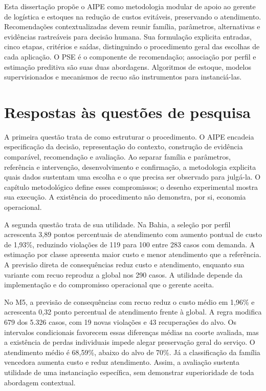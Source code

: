 
Esta dissertação propõe o AIPE como metodologia modular de apoio ao gerente de logística e estoques na redução de custos evitáveis, preservando o atendimento. Recomendações contextualizadas devem reunir família, parâmetros, alternativas e evidências rastreáveis para decisão humana. Sua formulação explicita entradas, cinco etapas, critérios e saídas, distinguindo o procedimento geral das escolhas de cada aplicação. O PSE é o componente de recomendação; associação por perfil e estimação preditiva são suas duas abordagens. Algoritmos de estoque, modelos supervisionados e mecanismos de recuo são instrumentos para instanciá-las.

\section{Respostas às questões de pesquisa}
A primeira questão trata de como estruturar o procedimento. O AIPE encadeia especificação da decisão, representação do contexto, construção de evidência comparável, recomendação e avaliação. Ao separar família e parâmetros, referência e intervenção, desenvolvimento e confirmação, a metodologia explicita quais dados sustentam uma escolha e o que precisa ser observado para julgá-la. O capítulo metodológico define esses compromissos; o desenho experimental mostra sua execução. A existência do procedimento não demonstra, por si, economia operacional.

A segunda questão trata de sua utilidade. Na Bahia, a seleção por perfil acrescenta 3,89 pontos percentuais de atendimento com aumento pontual de custo de 1,93\%, reduzindo violações de 119 para 100 entre 283 casos com demanda. A estimação por classe apresenta maior custo e menor atendimento que a referência. A previsão direta de consequências reduz custo e atendimento, enquanto sua variante com recuo reproduz a global nos 290 casos. A utilidade depende da implementação e do compromisso operacional que o gerente aceita.

No M5, a previsão de consequências com recuo reduz o custo médio em 1,96\% e acrescenta 0,32 ponto percentual de atendimento frente à global. A regra modifica 679 dos 5.326 casos, com 19 novas violações e 43 recuperações do alvo. Os intervalos condicionais favorecem essas diferenças médias na coorte avaliada, mas a existência de perdas individuais impede alegar preservação geral do serviço. O atendimento médio é 68,59\%, abaixo do alvo de 70\%. Já a classificação da família vencedora aumenta custo e reduz atendimento. Assim, a avaliação sustenta utilidade de uma instanciação específica, sem demonstrar superioridade de toda abordagem contextual.

